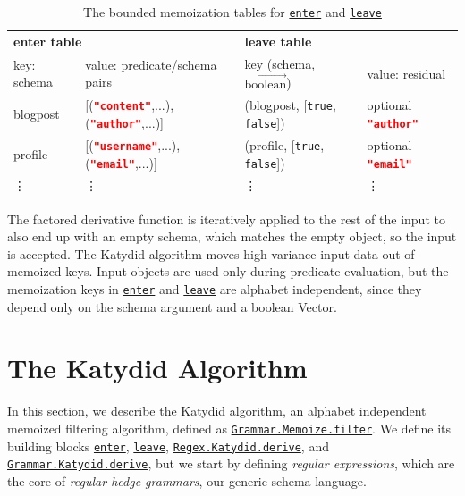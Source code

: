 \documentclass[acmsmall,%
  screen,%
  authorversion, %
  nonacm%
]{acmart}
\newcommand{\link}[2]{\mbox{\hyperref[#2]{\lstinline{#1}}}\xspace}
\newcommand{\GrammarKatydidDerive}{\link{Grammar.Katydid.derive}{def Grammar.Katydid.derive}}
\newcommand{\RegexKatydidDerive}{\link{Regex.Katydid.derive}{def Regex.Katydid.derive}}
\newcommand{\enter}{\link{enter}{def enter}}
\newcommand{\leave}{\link{leave}{def leave}}
\newcommand{\GrammarMemoizeFilter}{\link{Grammar.Memoize.filter}{def Grammar.Memoize.filter}}
\begin{document}
\begin{table}
\caption{The bounded memoization tables for \enter and \leave}
\label{table_memo}
\begin{tabular}{ll|ll}
\midrule
\multicolumn{2}{l|}{\textbf{enter table}}&
\multicolumn{2}{l}{\textbf{leave table}} \\
key: schema & value: predicate/schema pairs &
key (schema, $\overrightarrow{\mathrm{boolean}}$) & value: residual \\
\midrule
blogpost & [(\lstinline[language=json]|"content"|,...), (\lstinline[language=json]|"author"|,...)] &
(blogpost, [\lstinline{true}, \lstinline{false}]) & optional \lstinline[language=json]|"author"|\\
profile & [(\lstinline[language=json]|"username"|,...), (\lstinline[language=json]|"email"|,...)] &
(profile, [\lstinline{true}, \lstinline{false}]) & optional \lstinline[language=json]|"email"|\\
\vdots & \vdots & \vdots & \vdots \\
\end{tabular}
\end{table}

The factored derivative function is iteratively applied to the rest of the input to also end up with an empty schema, which matches the empty object, so the input is accepted.
The Katydid algorithm moves high-variance input data out of memoized keys.
Input objects are used only during predicate evaluation, but the memoization keys in \enter and \leave are alphabet independent, since they depend only on the schema argument and a boolean Vector.

\section{The Katydid Algorithm}\label{section_algorithm}

In this section, we describe the Katydid algorithm, an alphabet independent memoized filtering algorithm, defined as \GrammarMemoizeFilter.
We define its building blocks \enter, \leave, \RegexKatydidDerive, and \GrammarKatydidDerive, but we start by defining \emph{regular expressions}, which are the core of \emph{regular hedge grammars}, our generic schema language.
\end{document}
